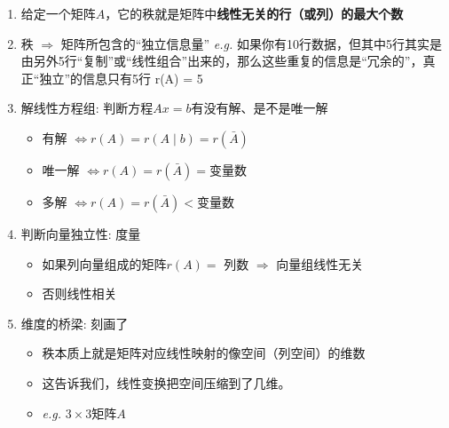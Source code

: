 \documentclass[./linear_algebra.tex]{subfiles}
\begin{document}
    \begin{enumerate}
        \item 给定一个矩阵$A$，它的秩就是矩阵中\textbf{线性无关的行（或列）的最大个数}
        \item 秩 $\Rightarrow$ 矩阵所包含的“独立信息量” \emph{e.g.} 如果你有10行数据，但其中5行其实是由另外5行“复制”或“线性组合”出来的，那么这些重复的信息是“冗余的”，真正“独立”的信息只有5行 \Rightarrow r(A) = 5
        \item 解线性方程组: 判断方程$Ax = b$有没有解、是不是唯一解
        \begin{itemize}
            \item 有解 $\Leftrightarrow r(A) = r(A \mid  b) = r(\bar{A})$
            \item 唯一解 $\Leftrightarrow r(A) = r(\bar{A}) = \text{变量数}$
            \item 多解 $\Leftrightarrow r(A) = r(\bar{A}) < \text{变量数}$
        \end{itemize}
        \item 判断向量独立性: 度量{\color{customgreen}{向量空间中有多少个独立方向}}
        \begin{itemize}
            \item 如果列向量组成的矩阵$r(A) =$ 列数 $\Rightarrow$ 向量组线性无关
            \item 否则线性相关
        \end{itemize}
        \item 维度的桥梁: 刻画了{\color{customgreen}{变换的本质效果}}
        \begin{itemize}
            \item 秩本质上就是矩阵对应线性映射的像空间（列空间）的维数
            \item 这告诉我们，线性变换把空间压缩到了几维。
            \item \emph{e.g.} $3 \times 3$矩阵$A$
        \end{itemize}

\end{enumerate}
\end{document}
